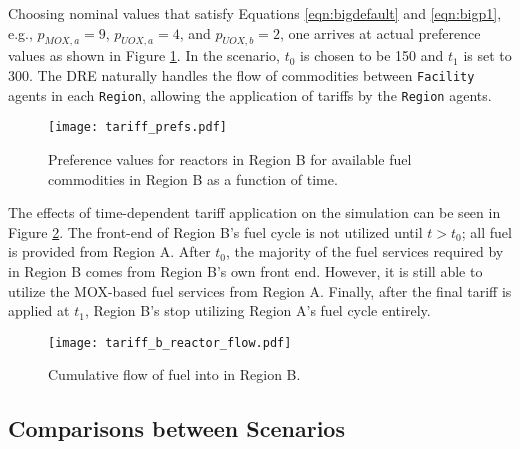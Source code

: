 Choosing nominal values that satisfy Equations \ref{eqn:bigdefault} and
\ref{eqn:bigp1}, e.g., $p_{MOX, a} = 9$, $p_{UOX, a} = 4$, and $p_{UOX, b} = 2$,
one arrives at actual preference values as shown in Figure \ref{fig:prefs}. In
the \tariff scenario, $t_0$ is chosen to be 150 and $t_1$ is set to 300. The DRE
naturally handles the flow of commodities between \texttt{Facility} agents in
each \texttt{Region}, allowing the application of tariffs by the \texttt{Region}
agents.

\begin{figure}
  \begin{center}
    \texttt{[image: tariff\_prefs.pdf]}
    \caption[]{
      \label{fig:prefs}
      Preference values for reactors in Region B for available fuel commodities
      in Region B as a function of time.}
  \end{center}
\end{figure}

The effects of time-dependent tariff application on the simulation can be seen
in Figure \ref{fig:tariff}. The front-end of Region B's fuel cycle is not
utilized until $t > t_0$; all fuel is provided from Region A. After $t_0$, the
majority of the fuel services required by \reactors in Region B comes from
Region B's own front end. However, it is still able to utilize the MOX-based
fuel services from Region A. Finally, after the final tariff is applied at
$t_1$, Region B's \reactors stop utilizing Region A's fuel cycle entirely.    

\begin{figure}
  \begin{center}
    \texttt{[image: tariff\_b\_reactor\_flow.pdf]}
    \caption[]{
      \label{fig:tariff}
      Cumulative flow of fuel into \reactors in Region B.}
  \end{center}
\end{figure}

\subsection{Comparisons between Scenarios}

